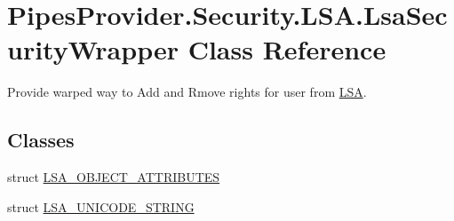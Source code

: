 \hypertarget{class_pipes_provider_1_1_security_1_1_l_s_a_1_1_lsa_security_wrapper}{}\section{Pipes\+Provider.\+Security.\+L\+S\+A.\+Lsa\+Security\+Wrapper Class Reference}
\label{class_pipes_provider_1_1_security_1_1_l_s_a_1_1_lsa_security_wrapper}


Provide warped way to Add and Rmove rights for user from \mbox{\hyperlink{namespace_pipes_provider_1_1_security_1_1_l_s_a}{L\+SA}}.  


\subsection*{Classes}
\begin{DoxyCompactItemize}
\item 
struct \mbox{\hyperlink{struct_pipes_provider_1_1_security_1_1_l_s_a_1_1_lsa_security_wrapper_1_1_l_s_a___o_b_j_e_c_t___a_t_t_r_i_b_u_t_e_s}{L\+S\+A\+\_\+\+O\+B\+J\+E\+C\+T\+\_\+\+A\+T\+T\+R\+I\+B\+U\+T\+ES}}
\item 
struct \mbox{\hyperlink{struct_pipes_provider_1_1_security_1_1_l_s_a_1_1_lsa_security_wrapper_1_1_l_s_a___u_n_i_c_o_d_e___s_t_r_i_n_g}{L\+S\+A\+\_\+\+U\+N\+I\+C\+O\+D\+E\+\_\+\+S\+T\+R\+I\+NG}}
\end{DoxyCompactItemize}
